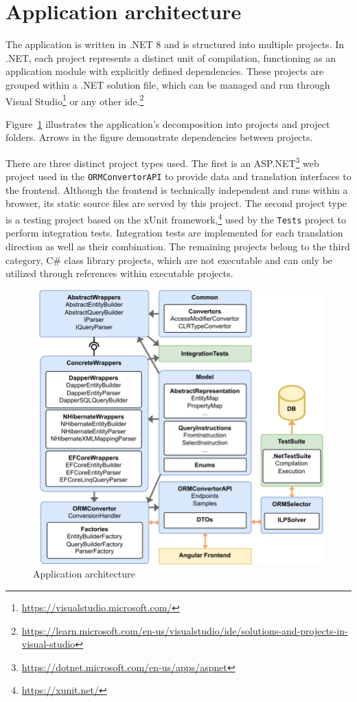 \section{Application architecture}
The application is written in .NET 8 and is structured into multiple projects. In .NET, each project represents a distinct unit of compilation, functioning as an application module with explicitly defined dependencies. These projects are grouped within a .NET solution file, which can be managed and run through Visual Studio\footnote{\url{https://visualstudio.microsoft.com/}} or any other \acrshort{ide}.\footnote{\url{https://learn.microsoft.com/en-us/visualstudio/ide/solutions-and-projects-in-visual-studio}} 

Figure~\ref{fig:app_architecture} illustrates the application's decomposition into projects and project folders. Arrows in the figure demonstrate dependencies between projects.

There are three distinct project types used. The first is an ASP.NET\footnote{\url{https://dotnet.microsoft.com/en-us/apps/aspnet}} web project used in the \texttt{ORMConvertorAPI} to provide data and translation interfaces to the frontend. Although the frontend is technically independent and runs within a browser, its static source files are served by this project. The second project type is a testing project based on the xUnit framework,\footnote{\url{https://xunit.net/}} used by the \texttt{Tests} project to perform integration tests. Integration tests are implemented for each translation direction as well as their combination. The remaining projects belong to the third category, C\# class library projects, which are not executable and can only be utilized through references within executable projects. 

\begin{figure}[!htp]
  \centering
  \includegraphics[scale=1]{thesis/img/thesis/06_architecture.drawio.pdf}
  \caption{Application architecture}
  \label{fig:app_architecture}
\end{figure}

